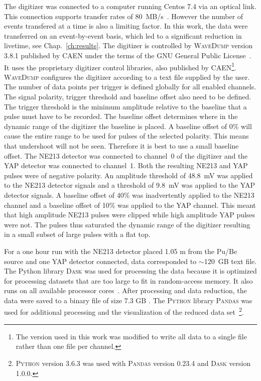 \documentclass[main.tex]{subfiles}
\begin{document}
The digitizer was connected to a computer running Centos 7.4 via an optical link. This connection supports transfer rates of \SI{80}{MB/s}~\cite{CAEN}. However the number of events transfered at a time is also a limiting factor. In this work, the data were transferred on an event-by-event basis, which led to a significant reduction in livetime, see Chap.~\ref{ch:results}. The digitizer is controlled by \textsc{WaveDump} version 3.8.1 published by CAEN under the terms of the GNU General Public License~\cite{WaveDump}. It uses the proprietary digitizer control libraries, also published by CAEN\footnote{The version used in this work was modified to write all data to a single file rather than one file per channel.}. 
\textsc{WaveDump} configures the digitizer according to a text file supplied by the user. The number of data points per trigger is defined globally for all enabled channels. The signal polarity, trigger threshold and baseline offset also need to be defined. The trigger threshold is the minimum amplitude relative to the baseline that a pulse must have to be recorded. The baseline offset determines where in the dynamic range of the digitizer the baseline is placed. A baseline offset of 0\% will cause the entire range to be used for pulses of the selected polarity. This means that undershoot will not be seen. Therefore it is best to use a small baseline offset. The NE213 detector was connected to channel~0 of the digitizer and the YAP detector was connected to channel~1. Both the resulting NE213 and YAP pulses were of negative polarity. An amplitude threshold of \SI{48.8}{mV} was applied to the NE213 detector signals and a threshold of \SI{9.8}{mV} was applied to the YAP detector signals. A baseline offset of 40\% was inadvertently applied to the NE213 channel and a baseline offset of 10\% was applied to the YAP channel. This meant that high amplitude NE213 pulses were clipped while high amplitude YAP pulses were not. The pulses thus saturated the dynamic range of the digitizer resulting in a small subset of large pulses with a flat top.

For a one hour run with the NE213 detector placed 1.05 m from the Pu/Be source and one YAP detector connected, data corresponded to $\sim$\SI{120}{GB} text file. The Python library \textsc{Dask} was used for processing the data because it is optimized for processing datasets that are too large to fit in random-access memory. It also runs on all available processor cores~\cite{Dask}. After processing and data reduction, the data were saved to a binary file of size 7.3 GB . The \textsc{Python} library \textsc{Pandas} was used for additional processing and the visualization of the reduced data set~\cite{Pandas}\footnote{\textsc{Python} version 3.6.3 was used with \textsc{Pandas} version 0.23.4 and \textsc{Dask} version 1.0.0.}.
\end{document}
